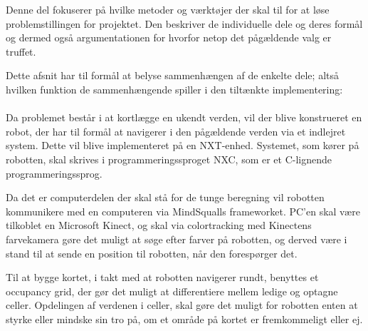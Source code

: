 Denne del fokuserer på hvilke metoder og værktøjer der skal til for at løse problemstillingen for projektet.
Den beskriver de individuelle dele og deres formål og dermed også argumentationen for hvorfor netop det pågældende valg er truffet.

Dette afsnit har til formål at belyse sammenhængen af de enkelte dele; altså hvilken funktion de sammenhængende spiller i den tiltænkte implementering:
\\
\\
Da problemet består i at kortlægge en ukendt verden, vil der blive konstrueret en robot, der har til formål at navigerer i den pågældende verden via et indlejret system.
Dette vil blive implementeret på en NXT-enhed.
Systemet, som kører på robotten, skal skrives i programmeringssproget NXC, som er et C-lignende programmeringssprog.

Da det er computerdelen der skal stå for de tunge beregning vil robotten kommunikere med en computeren via MindSqualls frameworket.
PC'en skal være tilkoblet en Microsoft Kinect, og skal via colortracking med Kinectens farvekamera gøre det muligt at søge efter farver på robotten, og derved være i stand til at sende en position til robotten, når den forespørger det.

Til at bygge kortet, i takt med at robotten navigerer rundt, benyttes et occupancy grid, der gør det muligt at differentiere mellem ledige og optagne celler.
Opdelingen af verdenen i celler, skal gøre det muligt for robotten enten at styrke eller mindske sin tro på, om et område på kortet er fremkommeligt eller ej.